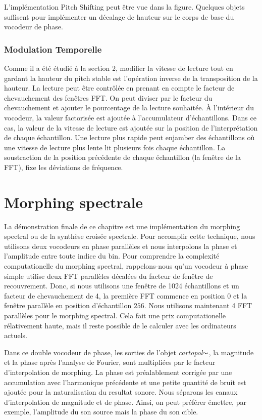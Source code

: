     L'implémentation Pitch Shifting peut être vue dans la figure. Quelques objets suffisent pour implémenter un décalage de hauteur sur le corps de base du vocodeur de phase.


\subsubsection{Modulation Temporelle}

    Comme il a été étudié à la section 2, modifier la vitesse de lecture tout en gardant la hauteur du pitch stable est l’opération inverse de la transposition de la hauteur. La lecture peut être contrôlée en prenant en compte le facteur de chevauchement des fenêtres FFT. On peut diviser par le facteur du chevauchement et ajouter le pourcentage de la lecture souhaitée. À l'intérieur du vocodeur, la valeur factorisée est ajoutée à l'accumulateur d'échantillons. Dans ce cas, la valeur de la vitesse de lecture est ajoutée sur la position de l'interprétation de chaque échantillon. Une lecture plus rapide peut enjamber des échantillons où une vitesse de lecture plus lente lit plusieurs fois chaque échantillon. La soustraction de la position précédente de chaque échantillon (la fenêtre de la FFT), fixe les déviations de fréquence. 

\section{Morphing spectrale}

La démonstration finale de ce chapitre est une implémentation du morphing spectral ou de la synthèse croisée spectrale. Pour accomplir cette technique, nous utilisons deux vocodeurs en phase parallèles et nous interpolons la phase et l’amplitude entre toute indice du bin. Pour comprendre la complexité computationelle du morphing spectral, rappelons-nous qu'un vocodeur à phase simple utilise deux FFT parallèles décalées du facteur de fenêtre de recouvrement. Donc, si nous utilisons une fenêtre de 1024 échantillons et un facteur de chevauchement de 4, la première FFT commence en position $ 0 $ et la fenêtre parallèle en position d’échantillon $256$. Nous utilisons maintenant 4 FFT parallèles pour le morphing spectral. Cela fait une prix computationelle rélativement haute, mais il reste possible de le calculer avec les ordinateurs actuels.

Dans ce double vocodeur de phase, les sorties de l'objet \textit{cartopol}$ \thicksim $, la magnitude et la phase après l'analyse de Fourier, sont multipliées par le facteur d'interpolation de morphing. La phase est préalablement corrigée par une accumulation avec l'harmonique précédente et une petite quantité de bruit est ajoutée pour la naturalisation du resultat sonore. Nous séparons les canaux d’interpolation de magnitude et de phase. Ainsi, on peut préférer émettre, par exemple, l’amplitude du son source mais la phase du son cible.

